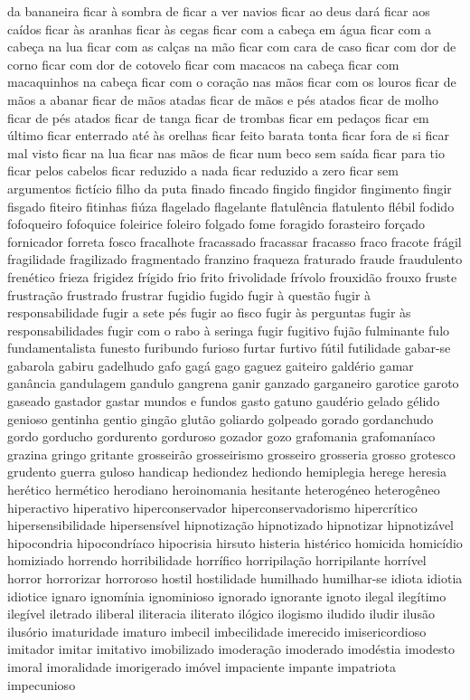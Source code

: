 \begin{appendices}
da bananeira ficar \`{a} sombra de ficar a ver navios ficar ao deus dar\'{a} ficar aos ca\'{i}dos ficar \`{a}s aranhas ficar \`{a}s cegas ficar com a cabe\c{c}a em \'{a}gua ficar com a cabe\c{c}a na lua ficar com as cal\c{c}as na m\~ao ficar com cara de caso ficar com dor de corno ficar com dor de cotovelo ficar com macacos na cabe\c{c}a ficar com macaquinhos na cabe\c{c}a ficar com o cora\c{c}\~ao nas m\~aos ficar com os louros ficar de m\~aos a abanar ficar de m\~aos atadas ficar de m\~aos e p\'{e}s atados ficar de molho ficar de p\'{e}s atados ficar de tanga ficar de trombas ficar em peda\c{c}os ficar em \'{u}ltimo ficar enterrado at\'{e} \`{a}s orelhas ficar feito barata tonta ficar fora de si ficar mal visto ficar na lua ficar nas m\~aos de ficar num beco sem sa\'{i}da ficar para tio ficar pelos cabelos ficar reduzido a nada ficar reduzido a zero ficar sem argumentos fict\'{i}cio filho da puta finado fincado fingido fingidor fingimento fingir fisgado fiteiro fitinhas fi\'{u}za flagelado flagelante flatul\^{e}ncia flatulento fl\'{e}bil fodido fofoqueiro fofoquice foleirice foleiro folgado fome foragido forasteiro for\c{c}ado fornicador forreta fosco fracalhote fracassado fracassar fracasso fraco fracote fr\'{a}gil fragilidade fragilizado fragmentado franzino fraqueza fraturado fraude fraudulento fren\'{e}tico frieza frigidez fr\'{i}gido frio frito frivolidade fr\'{i}volo frouxid\~ao frouxo fruste frustra\c{c}\~ao frustrado frustrar fugidio fugido fugir \`{a} quest\~ao fugir \`{a} responsabilidade fugir a sete p\'{e}s fugir ao fisco fugir \`{a}s perguntas fugir \`{a}s responsabilidades fugir com o rabo \`{a} seringa fugir fugitivo fuj\~ao fulminante fulo fundamentalista funesto furibundo furioso furtar furtivo f\'{u}til futilidade gabar-se gabarola gabiru gadelhudo gafo gag\'{a} gago gaguez gaiteiro gald\'{e}rio gamar gan\^{a}ncia gandulagem gandulo gangrena ganir ganzado garganeiro garotice garoto gaseado gastador gastar mundos e fundos gasto gatuno gaud\'{e}rio gelado g\'{e}lido genioso gentinha gentio ging\~ao glut\~ao goliardo golpeado gorado gordanchudo gordo gorducho gordurento gorduroso gozador gozo grafomania grafoman\'{i}aco grazina gringo gritante grosseir\~ao grosseirismo grosseiro grosseria grosso grotesco grudento guerra guloso handicap hediondez hediondo hemiplegia herege heresia her\'{e}tico herm\'{e}tico herodiano heroinomania hesitante heterog\'{e}neo heterog\^{e}neo hiperactivo hiperativo hiperconservador hiperconservadorismo hipercr\'{i}tico hipersensibilidade hipersens\'{i}vel hipnotiza\c{c}\~ao hipnotizado hipnotizar hipnotiz\'{a}vel hipocondria hipocondr\'{i}aco hipocrisia hirsuto histeria hist\'{e}rico homicida homic\'{i}dio homiziado horrendo horribilidade horr\'{i}fico horripila\c{c}\~ao horripilante horr\'{i}vel horror horrorizar horroroso hostil hostilidade humilhado humilhar-se idiota idiotia idiotice ignaro ignom\'{i}nia ignominioso ignorado ignorante ignoto ilegal ileg\'{i}timo ileg\'{i}vel iletrado iliberal iliteracia iliterato il\'{o}gico ilogismo iludido iludir ilus\~ao ilus\'{o}rio imaturidade imaturo imbecil imbecilidade imerecido imisericordioso imitador imitar imitativo imobilizado imodera\c{c}\~ao imoderado imod\'{e}stia imodesto imoral imoralidade imorigerado im\'{o}vel impaciente impante impatriota impecunioso 
\end{appendices}
